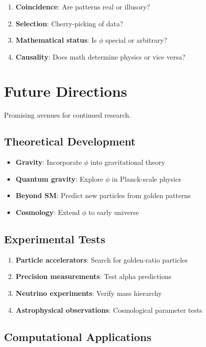 \begin{enumerate}
    \item \textbf{Coincidence}: Are patterns real or illusory?
    \item \textbf{Selection}: Cherry-picking of data?
    \item \textbf{Mathematical status}: Is $\phi$ special or arbitrary?
    \item \textbf{Causality}: Does math determine physics or vice versa?
\end{enumerate}

\section{Future Directions}

Promising avenues for continued research.

\subsection{Theoretical Development}

\begin{itemize}
    \item \textbf{Gravity}: Incorporate $\phi$ into gravitational theory
    \item \textbf{Quantum gravity}: Explore $\phi$ in Planck-scale physics
    \item \textbf{Beyond SM}: Predict new particles from golden patterns
    \item \textbf{Cosmology}: Extend $\phi$ to early universe
\end{itemize}

\subsection{Experimental Tests}

\begin{enumerate}
    \item \textbf{Particle accelerators}: Search for golden-ratio particles
    \item \textbf{Precision measurements}: Test alpha predictions
    \item \textbf{Neutrino experiments}: Verify mass hierarchy
    \item \textbf{Astrophysical observations}: Cosmological parameter tests
\end{enumerate}

\subsection{Computational Applications}

